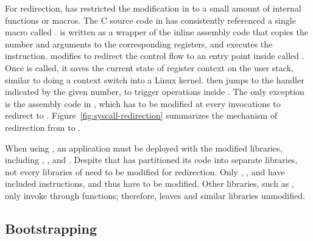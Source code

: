 For \linuxapi{} redirection,
\graphene{} has restricted the modification in \glibc{}
to a small amount of
internal functions or macros.
The C source code in \glibc{} has consistently referenced a single macro called
.
 is written as a wrapper of the inline assembly code
that copies the \linuxapi{} number and arguments to the corresponding registers,
and executes the  instruction.
\graphene{} modifies 
to redirect the control flow to
an entry point inside \thelibos{} called .
Once  is called, it saves the current state of register context on the user stack, similar to doing a context switch into a Linux kernel.
 then jumps to the \linuxapi{} handler
indicated by the given \linuxapi{} number, to trigger operations inside \thelibos{}.
The only exception is the assembly code in \glibc{}, which has
to be modified at every \linuxapi{} invocations to redirect to .
Figure~\ref{fig:syscall-redirection} summarizes the mechanism of \linuxapi{} redirection
from \glibc{} to \thelibos{}.


When using \graphene{}, an application must be deployed with the modified \libc{} libraries,
including , \libpthread{}, and \libdl{}.
Despite that \glibc{} has partitioned its code into separate libraries, not every libraries of \glibc{} need to be modified for \linuxapi{} redirection.
Only , \libpthread{}, and \libdl{} have included  instructions,
and thus have to be modified.
Other \libc{} libraries, such as ,
only invoke \linuxapis{} through \libc{} functions;
therefore, \graphene{} leaves  and similar \libc{} libraries unmodified.







\subsection{Bootstrapping}






